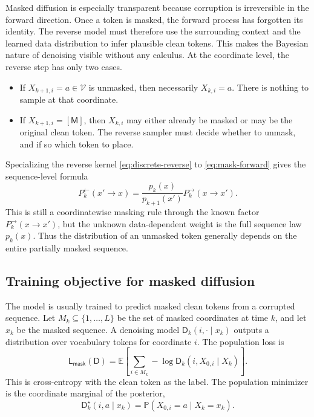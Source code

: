 \documentclass{amsart}
\numberwithin{equation}{section}
\theoremstyle{plain}
\theoremstyle{definition}
\theoremstyle{remark}
\newcommand{\E}{\mathbb{E}}
\newcommand{\Pp}{\mathbb{P}}
\newcommand{\mc}[1]{\mathcal{#1}}
\newcommand{\dstar}{\mathsf{D}^{\star}}
\newcommand{\denoiser}{\mathsf{D}}
\begin{document}
Masked diffusion is especially transparent because corruption is irreversible
in the forward direction.  Once a token is masked, the forward process has
forgotten its identity.  The reverse model must therefore use the surrounding
context and the learned data distribution to infer plausible clean tokens.
This makes the Bayesian nature of denoising visible without any calculus.  At
the coordinate level, the reverse step has only two cases.
\begin{itemize}
    \item If $X_{k+1,i}=a\in\mc{V}$ is unmasked, then necessarily
    $X_{k,i}=a$.  There is nothing to sample at that coordinate.
    \item If $X_{k+1,i}=[\mathsf M]$, then $X_{k,i}$ may either already be
    masked or may be the original clean token.  The reverse sampler must decide
    whether to unmask, and if so which token to place.
\end{itemize}
Specializing the reverse kernel \eqref{eq:discrete-reverse} to
\eqref{eq:mask-forward} gives the sequence-level formula
\begin{equation}\label{eq:mask-reverse-sequence}
    P_k^{\leftarrow}(x'\to x)
    =
    \frac{p_k(x)}{p_{k+1}(x')}
    P_k^{\to}(x\to x').
\end{equation}
This is still a coordinatewise masking rule through the known factor
$P_k^{\to}(x\to x')$, but the unknown data-dependent weight is the full
sequence law $p_k(x)$.  Thus the distribution of an unmasked token generally
depends on the entire partially masked sequence.

\subsection{Training objective for masked diffusion}

The model is usually trained to predict masked clean tokens from a corrupted
sequence.  Let $M_k\subseteq\{1,\ldots,L\}$ be the set of masked coordinates at
time $k$, and let $x_k$ be the masked sequence.  A denoising model
$\denoiser_k(i,\cdot\mid x_k)$ outputs a distribution over vocabulary
tokens for coordinate $i$.  The population loss is
\begin{equation}\label{eq:masked-loss}
    \mathsf L_{\mathsf{mask}}(\denoiser)
    =
    \E\left[
    \sum_{i\in M_k}
    -\log \denoiser_k(i,X_{0,i}\mid X_k)
    \right].
\end{equation}
This is cross-entropy with the clean token as the label.  The population
minimizer is the coordinate marginal of the posterior,
\[
    \dstar_k(i,a\mid x_k)
    =
    \Pp(X_{0,i}=a\mid X_k=x_k).
\]
\end{document}
